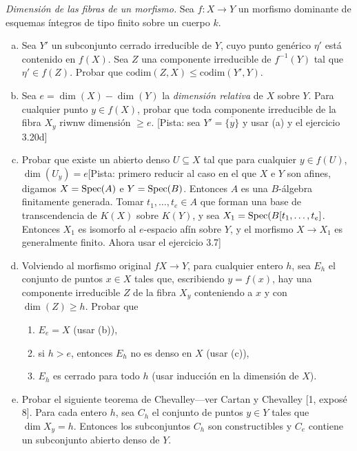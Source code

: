 \documentclass[twoside]{article}
\begin{document}
\newpage

\begin{ejercicio}{3.22}\emph{Dimensión de las fibras de un morfismo.} Sea $f:X\to Y$ un morfismo dominante de esquemas íntegros de tipo finito sobre un cuerpo $k$. 
\begin{enumerate}[(a)]
\item Sea $Y'$ un subconjunto cerrado irreducible de $Y$, cuyo punto genérico $\eta'$ está contenido en $f(X)$. Sea $Z$ una componente irreducible de $f^{-1}(Y)$ tal que $\eta'\in f(Z)$. Probar que $\mathrm{codim}(Z,X)\leq \mathrm{codim}(Y',Y)$. 
\item Sea $e=\dim(X)-\dim(Y)$ la \emph{dimensión relativa} de $X$ sobre $Y$. Para cualquier punto $y\in f(X)$, probar que toda componente irreducible de la fibra $X_y$ riwnw dimensión $\geq e$. [Pista: sea $Y'=\overline{\{y\}}$ y usar (a) y el ejercicio 3.20d]
\item Probar que existe un abierto denso $U\subseteq X$ tal que para cualquier $y\in f(U)$, $\dim(U_y)=e$[Pista: primero reducir al caso en el que $X$ e $Y$ son afines, digamos $X=\operatorname{Spec}(A)$ e $Y=\operatorname{Spec}(B)$. Entonces $A$ es una $B$-álgebra finitamente generada. Tomar $t_1,\dots, t_e\in A$ que forman una base de transcendencia de $K(X)$ sobre $K(Y)$, y sea $X_1=\operatorname{Spec}(B[t_1,\dots, t_e]$. Entonces $X_1$ es isomorfo al $e$-espacio afín sobre $Y$, y el morfismo $X\to X_1$ es generalmente finito. Ahora usar el ejercicio 3.7]
\item Volviendo al morfismo original $fX\to Y$, para cualquier entero $h$, sea $E_h$ el conjunto de puntos $x\in X$ tales que, escribiendo $y=f(x)$, hay una componente irreducible $Z$ de la fibra $X_y$ conteniendo a $x$ y con $\dim(Z)\geq h$. Probar que
\begin{enumerate}
\item $E_e=X$ (usar (b)),
\item si $h>e$, entonces $E_h$ no es denso en $X$ (usar (c)),
\item $E_h$ es cerrado para todo $h$ (usar inducción en la dimensión de $X$).
\end{enumerate}
\item Probar el siguiente teorema de Chevalley---ver Cartan y Chevalley [1, exposé 8]. Para cada entero $h$, sea $C_h$ el conjunto de puntos $y\in Y$ tales que $\dim X_y=h$. Entonces los subconjuntos $C_h$ son constructibles y $C_e$ contiene un subconjunto abierto denso de $Y$.
\end{enumerate}

\end{ejercicio}
\end{document}
